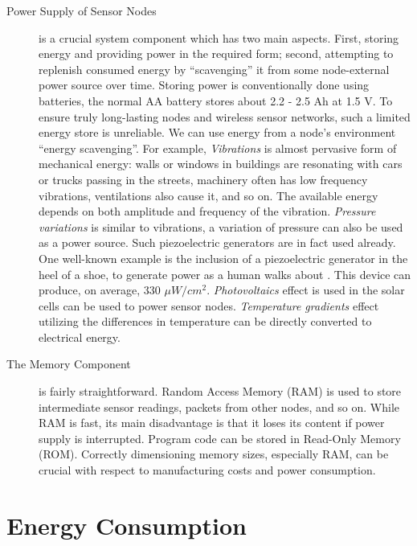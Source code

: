 \begin{description}
	\item[Power Supply of Sensor Nodes] is a crucial system component which has two main aspects.
		First, storing energy and providing power in the required form; second, attempting to replenish consumed energy by ``scavenging'' it from some node-external power source over time.
		Storing power is conventionally done using batteries, the normal AA battery stores about 2.2 - 2.5 Ah at 1.5 V.
		To ensure truly long-lasting nodes and wireless sensor networks, such a limited energy store is unreliable. 
		We can use energy from a node’s environment ``energy scavenging''.
		For example, \textit{Vibrations} is almost pervasive form of mechanical energy: walls or windows in buildings are resonating with cars or trucks passing in the streets, machinery often has low frequency vibrations, ventilations also cause it, and so on.
		The available energy depends on both amplitude and frequency of the vibration.
		\textit{Pressure variations} is similar to vibrations, a variation of pressure can also be used as a power source. 
		Such piezoelectric generators are in fact used already. 
		One well-known example is the inclusion of a piezoelectric generator in the heel of a shoe, to generate power as a human walks about \cite{shenck2001energy}. 
		This device can produce, on average, 330 $\mu W / cm^{2}$. 
		\textit{Photovoltaics} effect is used in the solar cells can be used to power sensor nodes.
		\textit{Temperature gradients} effect utilizing the differences in temperature can be directly converted to electrical energy.

	\item[The Memory Component] is fairly straightforward. 
		Random Access Memory (RAM) is used to store intermediate sensor readings, packets from other nodes, and so on. 
		While RAM is fast, its main disadvantage is that it loses its content if power supply is interrupted. 
		Program code can be stored in Read-Only Memory (ROM). 
		Correctly dimensioning memory sizes, especially RAM, can be crucial with respect to manufacturing costs and power consumption.
	\end{description}

\section{Energy Consumption}

